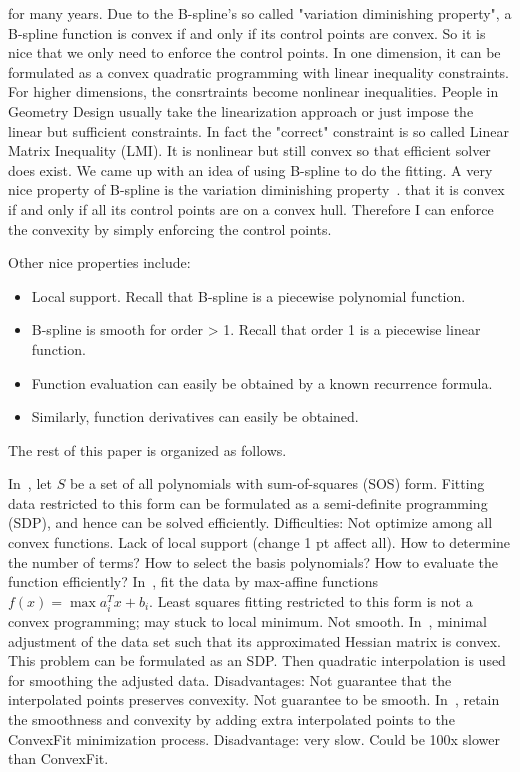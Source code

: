 \documentclass[10pt,twocolumn]{article}          %
\begin{document}
for many years. Due to the B-spline's so called "variation diminishing
property", a B-spline function is convex if and only if its control
points are convex. So it is nice that we only need to enforce the
control points. In one dimension, it can be formulated as a convex
quadratic programming with linear inequality constraints. For higher
dimensions, the consrtraints become nonlinear inequalities. People in
Geometry Design usually take the linearization approach or just impose
the linear but sufficient constraints. In fact the "correct"
constraint is so called Linear Matrix Inequality (LMI). It is
nonlinear but still convex so that efficient solver does exist. We
came up with an idea of using B-spline to do the fitting. A very nice
property of B-spline is the variation diminishing property~\cite{GMP_03}. that it
is convex if and only if all its control points are on a convex
hull. Therefore I can enforce the convexity by simply enforcing the
control points. 

Other nice properties include:
\begin{itemize}
\item
Local support. Recall that B-spline is a piecewise polynomial function.
\item
B-spline is smooth for order > 1. Recall that order 1 is a piecewise linear function.
\item
Function evaluation can easily be obtained by a known recurrence formula.
\item
Similarly, function derivatives can easily be obtained.
\end{itemize}

The rest of this paper is organized as follows. 


In~\cite{Trac_05}, let $S$ be a set of all polynomials with sum-of-squares (SOS)
form. Fitting data restricted to this form can be formulated as a
semi-definite programming (SDP), and hence can be solved
efficiently. Difficulties: Not optimize among all convex
functions. Lack of local support (change 1 pt affect all). How to
determine the number of terms? How to select the basis polynomials?
How to evaluate the function efficiently? In~\cite{Piecewise_06}, fit the data by
max-affine functions $f(x) = \max{a_i^T x + b_i}$. Least squares
fitting restricted to this form is not a convex programming; may stuck
to local minimum. Not smooth. In~\cite{Roy_05}, minimal adjustment of the data
set such that its approximated Hessian matrix is convex. This problem
can be formulated as an SDP. Then quadratic interpolation is used for
smoothing the adjusted data. Disadvantages: Not guarantee that the
interpolated points preserves convexity. Not guarantee to be
smooth. In~\cite{Roy_06}, retain the smoothness and convexity by adding extra
interpolated points to the ConvexFit minimization
process. Disadvantage: very slow. Could be 100x slower than
ConvexFit. 
\end{document}

